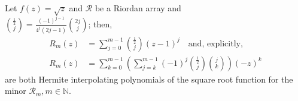 
\begin{theorem}
\label{thm:sqrt-Hermite-interpolating-poly-implicit}
Let $f(z)=\sqrt{z}$ and $\mathcal{R}$ be a Riordan array and\\
$ {\frac{1}{2}\choose {j}} = \frac{(-1)^{j-1}}{4^{j}(2j-1)}{ {2j}\choose{j} }$;
then,
\begin{equation}
  \label{eq:sqrt-Hermite-interpolating-poly}
  \begin{split}
  R_{m}(z) &= \sum_{j=0}^{m-1}{{\frac{1}{2} \choose j}\left(z-1\right)^{j}}
  \quad\text{and, explicitly,}\\
  R_{m}(z) &= \sum_{k=0}^{m-1}{\left(\sum_{j=k}^{m-1}{(-1)^{j}{{\frac{1}{2}}\choose{j}}{{j}\choose{k}}}\right)(-z)^{k}}
  \end{split}
\end{equation}
are both Hermite interpolating polynomials of the square root function for the minor
$\mathcal{R}_{m}, m\in\mathbb{N}$.
\end{theorem}

